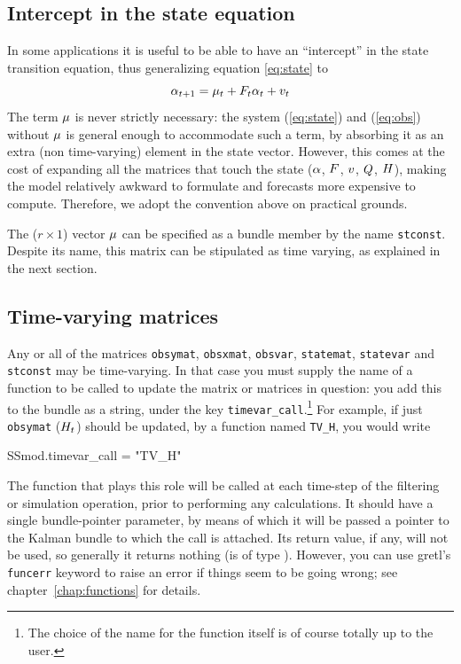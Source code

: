 \subsection{Intercept in the state equation}
\label{sec:stconst}

In some applications it is useful to be able to have an ``intercept''
in the state transition equation, thus generalizing equation
\eqref{eq:state} to
\[
  \alpha_{t+1} = \mu_t + F_t \alpha_t + v_t \\
\]
The term $\mu$ is never strictly necessary: the system
(\ref{eq:state}) and (\ref{eq:obs}) without $\mu$ is general
enough to accommodate such a term, by absorbing it as an extra (non
time-varying) element in the state vector.  However, this comes at the
cost of expanding all the matrices that touch the state ($\alpha$,
$F$, $v$, $Q$, $H$), making the model
relatively awkward to formulate and forecasts more expensive to
compute. Therefore, we adopt the convention above on practical
grounds.

The ($r \times 1$) vector $\mu$ can be specified as a bundle
member by the name \texttt{stconst}. Despite its name, this matrix can
be stipulated as time varying, as explained in the next section.

\subsection{Time-varying matrices}
\label{sec:tvarying}

Any or all of the matrices \texttt{obsymat}, \texttt{obsxmat},
\texttt{obsvar}, \texttt{statemat}, \texttt{statevar} and
\texttt{stconst} may be time-varying.  In that case you must supply
the name of a function to be called to update the matrix or matrices
in question: you add this to the bundle as a string, under the key
\texttt{timevar\_call}.\footnote{The choice of the name for the
  function itself is of course totally up to the user.} For example,
if just \texttt{obsymat} ($H_t$) should be updated, by a
function named \texttt{TV\_H}, you would write
%
\begin{code}
SSmod.timevar_call = "TV_H"
\end{code}
%
The function that plays this role will be called at each time-step of
the filtering or simulation operation, prior to performing any
calculations. It should have a single bundle-pointer parameter, by
means of which it will be passed a pointer to the Kalman bundle to
which the call is attached.  Its return value, if any, will not be
used, so generally it returns nothing (is of type ).
However, you can use gretl's \texttt{funcerr} keyword to raise an
error if things seem to be going wrong; see
chapter~\ref{chap:functions} for details.


